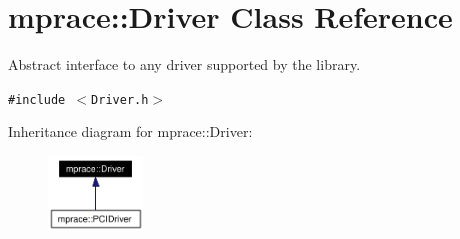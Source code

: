 \hypertarget{classmprace_1_1Driver}{
\section{mprace::Driver Class Reference}
\label{classmprace_1_1Driver}
}
Abstract interface to any driver supported by the library.  


{\tt \#include $<$Driver.h$>$}

Inheritance diagram for mprace::Driver:\begin{figure}[H]
\begin{center}
\leavevmode
\includegraphics[width=71pt]{classmprace_1_1Driver__inherit__graph}
\end{center}
\end{figure}
